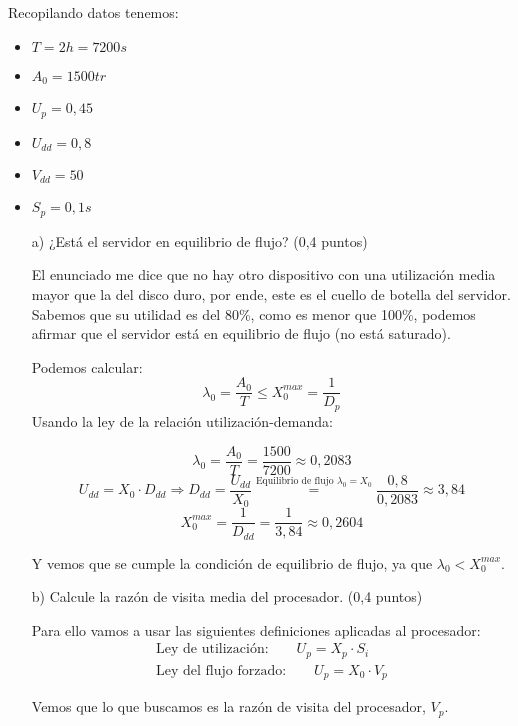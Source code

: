 \documentclass[a4paper,12pt]{article}
\begin{document}
Recopilando datos tenemos:
\begin{itemize}
    \item $T=2h = 7200s$
    \item $A_0 = 1500tr$
    \item  $U_p = 0,45$
    \item  $U_{dd} = 0,8$
    \item $V_{dd} = 50$
    \item $S_p = 0,1s$
\end{itemize}


\begin{enumerate}

    \item[a)] ¿Está el servidor en equilibrio de flujo? (0,4 puntos)

    El enunciado me dice que no hay otro dispositivo con una utilización media mayor que la del disco duro, por ende, este es el cuello de botella del servidor. Sabemos que su utilidad es del 80\%, como es menor que 100\%, podemos afirmar que el servidor está en equilibrio de flujo (no está saturado).


    Podemos calcular:
    $$
    \lambda_0 = \frac{A_0}{T} \leq X_0^{max} = \frac{1}{D_{p}}
    $$
    Usando la ley de la relación utilización-demanda:

    $$
    \lambda_0 = \frac{A_0}{T} = \frac{1500}{7200} \approx 0,2083
    $$
    $$
    U_{dd} = X_0 \cdot D_{dd} \Rightarrow D_{dd} = \frac{U_{dd}} {X_0} \overset{\text{Equilibrio de flujo } \lambda_0 = X_0}{=} \frac{0,8}{0,2083} \approx 3,84
    $$
    $$
    X_0^{max} = \frac{1}{D_{dd}} = \frac{1}{3,84} \approx 0,2604
    $$

    Y vemos que se cumple la condición de equilibrio de flujo, ya que $\lambda_0 < X_0^{max}$.

    \item[b)] Calcule la razón de visita media del procesador. (0,4 puntos)
    
    Para ello vamos a usar las siguientes definiciones aplicadas al procesador:
    \begin{align*}
        \text{Ley de utilización:} \qquad U_p = X_p \cdot S_i \\
        \text{Ley del flujo forzado:} \qquad U_p = X_0 \cdot V_p
    \end{align*}

    Vemos que lo que buscamos es la razón de visita del procesador, $V_p$. 


\end{enumerate}
\end{document}
